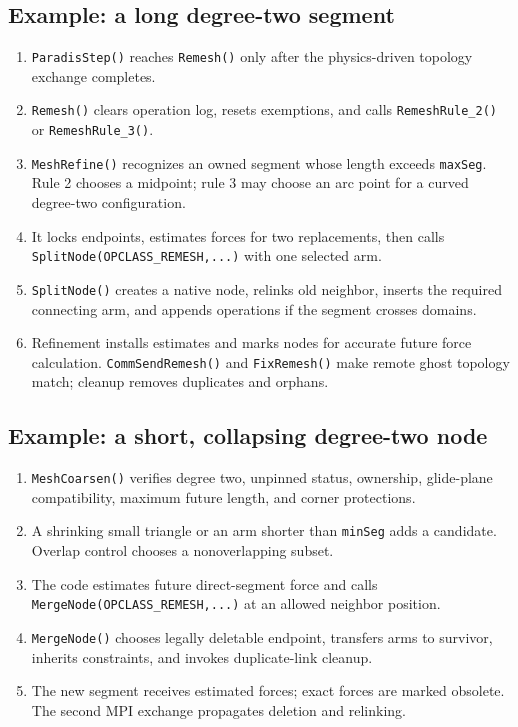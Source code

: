 \documentclass[11pt]{article}
\newcommand{\code}[1]{\texorpdfstring{\nolinkurl{#1}}{#1}}
\begin{document}
\subsection{Example: a long degree-two segment}

\begin{enumerate}
\item \code{ParadisStep()} reaches \code{Remesh()} only after the
physics-driven topology exchange completes.
\item \code{Remesh()} clears operation log, resets exemptions, and calls
\code{RemeshRule_2()} or \code{RemeshRule_3()}.
\item \code{MeshRefine()} recognizes an owned segment whose length exceeds
\code{maxSeg}. Rule 2 chooses a midpoint; rule 3 may choose an arc point for
a curved degree-two configuration.
\item It locks endpoints, estimates forces for two replacements, then calls
\code{SplitNode(OPCLASS_REMESH,...)} with one selected arm.
\item \code{SplitNode()} creates a native node, relinks old neighbor, inserts
the required connecting arm, and appends operations if the segment crosses
domains.
\item Refinement installs estimates and marks nodes for accurate future force
calculation. \code{CommSendRemesh()} and \code{FixRemesh()} make remote ghost
topology match; cleanup removes duplicates and orphans.
\end{enumerate}

\subsection{Example: a short, collapsing degree-two node}

\begin{enumerate}
\item \code{MeshCoarsen()} verifies degree two, unpinned status, ownership,
glide-plane compatibility, maximum future length, and corner protections.
\item A shrinking small triangle or an arm shorter than \code{minSeg} adds a
candidate. Overlap control chooses a nonoverlapping subset.
\item The code estimates future direct-segment force and calls
\code{MergeNode(OPCLASS_REMESH,...)} at an allowed neighbor position.
\item \code{MergeNode()} chooses legally deletable endpoint, transfers arms
to survivor, inherits constraints, and invokes duplicate-link cleanup.
\item The new segment receives estimated forces; exact forces are marked
obsolete. The second MPI exchange propagates deletion and relinking.
\end{enumerate}
\end{document}
